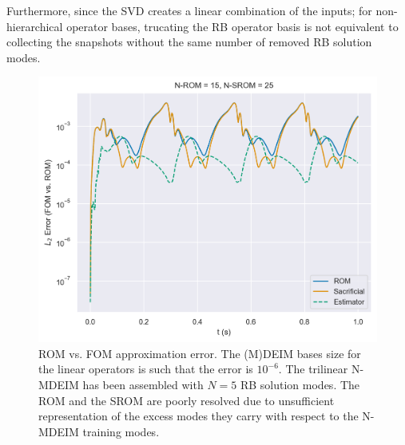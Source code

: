 \documentclass[../../thesis.tex]{subfiles}
\begin{document}
Furthermore, since the SVD creates a linear combination of the inputs;
for non-hierarchical operator bases, trucating the RB operator basis is 
not equivalent to collecting the snapshots without the same number of removed RB solution modes.

\newpage
\begin{figure}[h]
    \includegraphics[width =\columnwidth]{research_project/piston/figures/nonlinear_displacement/arbitrary/error_estimation_rom_15_srom_25_modes_5.png}
    \caption{ROM vs. FOM approximation error.
    The (M)DEIM bases size for the linear operators is such that the error is $10^{-6}$.
    The trilinear N-MDEIM has been assembled with $N=5$ RB solution modes.
    The ROM and the SROM are poorly resolved due to unsufficient representation of the excess
    modes they carry with respect to the N-MDEIM training modes.}
    \label{fig:nlinear_disp_modes_5_rom_15}
\end{figure}
\end{document}
